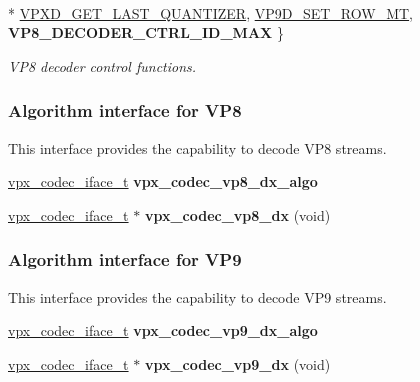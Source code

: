\begin{DoxyCompactItemize}
\\*
\hyperlink{group__vp8__decoder_ggaf9dd3f2e6d1412106ee791af768e57c1a96ef4253540f901d6bd46afeef3d41c3}{V\+P\+X\+D\+\_\+\+G\+E\+T\+\_\+\+L\+A\+S\+T\+\_\+\+Q\+U\+A\+N\+T\+I\+Z\+ER}, 
\hyperlink{group__vp8__decoder_ggaf9dd3f2e6d1412106ee791af768e57c1a387b0251963942c5589c830a77dfa46b}{V\+P9\+D\+\_\+\+S\+E\+T\+\_\+\+R\+O\+W\+\_\+\+MT}, 
{\bfseries V\+P8\+\_\+\+D\+E\+C\+O\+D\+E\+R\+\_\+\+C\+T\+R\+L\+\_\+\+I\+D\+\_\+\+M\+AX}
 \}\begin{DoxyCompactList}\small\item\em V\+P8 decoder control functions. \end{DoxyCompactList}
\end{DoxyCompactItemize}
\subsubsection*{Algorithm interface for V\+P8}
\label{_amgrp0b829b38ff2e659173b35cd78e0735bd}%
This interface provides the capability to decode V\+P8 streams. \begin{DoxyCompactItemize}
\item 
\hyperlink{group__codec_gae99c3b04f4a567a311211cce3ae6b83b}{vpx\+\_\+codec\+\_\+iface\+\_\+t} {\bfseries vpx\+\_\+codec\+\_\+vp8\+\_\+dx\+\_\+algo}\hypertarget{group__vp8__decoder_ga1e151f9094620511e7aa49c04bf8b79e}{}\label{group__vp8__decoder_ga1e151f9094620511e7aa49c04bf8b79e}

\item 
\hyperlink{group__codec_gae99c3b04f4a567a311211cce3ae6b83b}{vpx\+\_\+codec\+\_\+iface\+\_\+t} $\ast$ {\bfseries vpx\+\_\+codec\+\_\+vp8\+\_\+dx} (void)\hypertarget{group__vp8__decoder_ga105d15fdb6baef8a2f02d6d5283847fb}{}\label{group__vp8__decoder_ga105d15fdb6baef8a2f02d6d5283847fb}

\end{DoxyCompactItemize}
\subsubsection*{Algorithm interface for V\+P9}
\label{_amgrp9a787aae8f239d3b1cb9aeff16fb31ef}%
This interface provides the capability to decode V\+P9 streams. \begin{DoxyCompactItemize}
\item 
\hyperlink{group__codec_gae99c3b04f4a567a311211cce3ae6b83b}{vpx\+\_\+codec\+\_\+iface\+\_\+t} {\bfseries vpx\+\_\+codec\+\_\+vp9\+\_\+dx\+\_\+algo}\hypertarget{group__vp8__decoder_gabb581a7e48d55dbda975c8bfbc2d615c}{}\label{group__vp8__decoder_gabb581a7e48d55dbda975c8bfbc2d615c}

\item 
\hyperlink{group__codec_gae99c3b04f4a567a311211cce3ae6b83b}{vpx\+\_\+codec\+\_\+iface\+\_\+t} $\ast$ {\bfseries vpx\+\_\+codec\+\_\+vp9\+\_\+dx} (void)\hypertarget{group__vp8__decoder_ga62b70b5b21a01ab2d57adb9f67f25d60}{}\label{group__vp8__decoder_ga62b70b5b21a01ab2d57adb9f67f25d60}

\end{DoxyCompactItemize}



